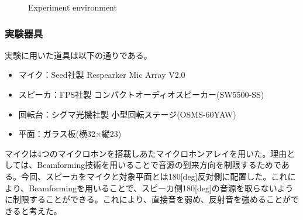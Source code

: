 \begin{figure}[tb]
    \centering
    \caption{Experiment environment}
    \label{fig:exp_photo}
\end{figure}

\clearpage

\subsubsection{実験器具}
実験に用いた道具は以下の通りである。
\begin{itemize}
	\item マイク：Seed社製 Respearker Mic Array V2.0
	\item スピーカ：FPS社製 コンパクトオーディオスピーカー(SW5500-SS)
    \item 回転台：シグマ光機社製 小型回転ステージ(OSMS-60YAW)
    \item 平面：ガラス板(横32×縦23)
\end{itemize}
マイクは4つのマイクロホンを搭載しあたマイクロホンアレイを用いた。理由としては、Beamforming技術を用いることで音源の到来方向を制限するためである。今回、スピーカをマイクと対象平面とは180[deg]反対側に配置した。これにより、Beamformingを用いることで、スピーカ側180[deg]の音源を取らないように制限することができる。これにより、直接音を弱め、反射音を強めることができると考えた。

